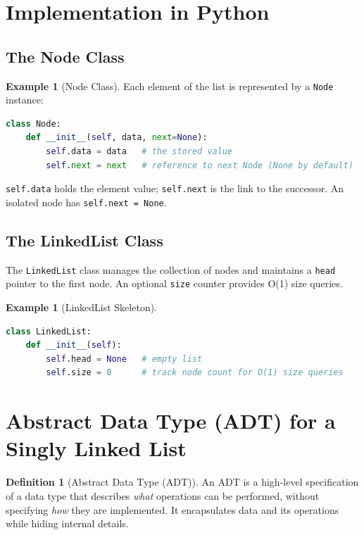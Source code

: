 \documentclass[11pt, a4paper, notitlepage]{report}
\theoremstyle{definition}
\newtheorem{definition}[theorem]{Definition}
\theoremstyle{remark}
\theoremstyle{definition}
\newtheorem{example}[theorem]{Example}
\begin{document}
\section{Implementation in Python}
\label{sec:ll-implementation}

\subsection{The Node Class}
\label{subsec:node-class}

\begin{example}[Node Class]
Each element of the list is represented by a \texttt{Node} instance:
\begin{lstlisting}[language=Python]
class Node:
    def __init__(self, data, next=None):
        self.data = data   # the stored value
        self.next = next   # reference to next Node (None by default)
\end{lstlisting}
\texttt{self.data} holds the element value; \texttt{self.next} is the link to
the successor. An isolated node has \texttt{self.next = None}.
\end{example}

\subsection{The LinkedList Class}
\label{subsec:ll-class}

The \texttt{LinkedList} class manages the collection of nodes and maintains a
\texttt{head} pointer to the first node. An optional \texttt{size} counter
provides O(1) size queries.

\begin{example}[LinkedList Skeleton]
\leavevmode
\begin{lstlisting}[language=Python]
class LinkedList:
    def __init__(self):
        self.head = None   # empty list
        self.size = 0      # track node count for O(1) size queries
\end{lstlisting}
\end{example}

\section{Abstract Data Type (ADT) for a Singly Linked List}
\label{sec:ll-adt}

\begin{definition}[Abstract Data Type (ADT)]
An ADT is a high-level specification of a data type that describes \emph{what}
operations can be performed, without specifying \emph{how} they are implemented.
It encapsulates data and its operations while hiding internal details.
\end{definition}
\end{document}
